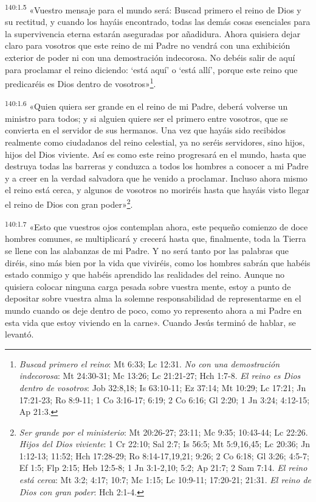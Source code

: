 \par 
\textsuperscript{140:1.5} «Vuestro mensaje para el mundo será: Buscad primero el reino de Dios y su rectitud, y cuando los hayáis encontrado, todas las demás cosas esenciales para la supervivencia eterna estarán aseguradas por añadidura. Ahora quisiera dejar claro para vosotros que este reino de mi Padre no vendrá con una exhibición exterior de poder ni con una demostración indecorosa. No debéis salir de aquí para proclamar el reino diciendo: `está aquí' o `está allí', porque este reino que predicaréis es Dios dentro de vosotros»\footnote{\textit{Buscad primero el reino}: Mt 6:33; Lc 12:31. \textit{No con una demostración indecorosa}: Mt 24:30-31; Mc 13:26; Lc 21:21-27; Hch 1:7-8. \textit{El reino es Dios dentro de vosotros}: Job 32:8,18; Is 63:10-11; Ez 37:14; Mt 10:29; Lc 17:21; Jn 17:21-23; Ro 8:9-11; 1 Co 3:16-17; 6:19; 2 Co 6:16; Gl 2:20; 1 Jn 3:24; 4:12-15; Ap 21:3.}.

\par 
\textsuperscript{140:1.6} «Quien quiera ser grande en el reino de mi Padre, deberá volverse un ministro para todos; y si alguien quiere ser el primero entre vosotros, que se convierta en el servidor de sus hermanos. Una vez que hayáis sido recibidos realmente como ciudadanos del reino celestial, ya no seréis servidores, sino hijos, hijos del Dios viviente. Así es como este reino progresará en el mundo, hasta que destruya todas las barreras y conduzca a todos los hombres a conocer a mi Padre y a creer en la verdad salvadora que he venido a proclamar. Incluso ahora mismo el reino está cerca, y algunos de vosotros no moriréis hasta que hayáis visto llegar el reino de Dios con gran poder»\footnote{\textit{Ser grande por el ministerio}: Mt 20:26-27; 23:11; Mc 9:35; 10:43-44; Lc 22:26. \textit{Hijos del Dios viviente}: 1 Cr 22:10; Sal 2:7; Is 56:5; Mt 5:9,16,45; Lc 20:36; Jn 1:12-13; 11:52; Hch 17:28-29; Ro 8:14-17,19,21; 9:26; 2 Co 6:18; Gl 3:26; 4:5-7; Ef 1:5; Flp 2:15; Heb 12:5-8; 1 Jn 3:1-2,10; 5:2; Ap 21:7; 2 Sam 7:14. \textit{El reino está cerca}: Mt 3:2; 4:17; 10:7; Mc 1:15; Lc 10:9-11; 17:20-21; 21:31. \textit{El reino de Dios con gran poder}: Hch 2:1-4.}.

\par 
\textsuperscript{140:1.7} «Esto que vuestros ojos contemplan ahora, este pequeño comienzo de doce hombres comunes, se multiplicará y crecerá hasta que, finalmente, toda la Tierra se llene con las alabanzas de mi Padre. Y no será tanto por las palabras que diréis, sino más bien por la vida que viviréis, como los hombres sabrán que habéis estado conmigo y que habéis aprendido las realidades del reino. Aunque no quisiera colocar ninguna carga pesada sobre vuestra mente, estoy a punto de depositar sobre vuestra alma la solemne responsabilidad de representarme en el mundo cuando os deje dentro de poco, como yo represento ahora a mi Padre en esta vida que estoy viviendo en la carne». Cuando Jesús terminó de hablar, se levantó.

